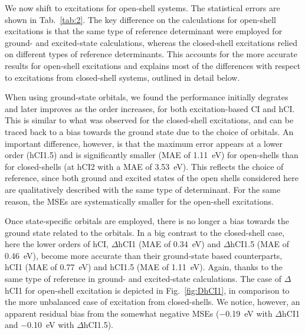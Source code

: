 \documentclass[aip,jcp,reprint,noshowkeys,superscriptaddress]{revtex4-1}
\begin{document}
We now shift to excitations for open-shell systems.
The statistical errors are shown in Tab.~\ref{tab:2}.
The key difference on the calculations for open-shell excitations is that the same type of reference determinant were employed for ground- and excited-state calculations,
whereas the closed-shell excitations relied on different types of reference determinants.
This accounts for the more accurate results for open-shell excitations and explains most of the differences with respect to excitations from closed-shell systems, outlined in detail below.


When using ground-state orbitals, we found the performance initially degrates and later improves as the order increases, for both excitation-based CI and hCI.
This is similar to what was observed for the closed-shell excitations, 
and can be traced back to a bias towards the ground state due to the choice of orbitals.
An important difference, however, is that the maximum error appears at a lower order (hCI1.5) and is significantly smaller (MAE of \SI{1.11}{\eV}) for open-shells
than for closed-shells (at hCI2 with a MAE of \SI{3.53}{\eV}).
This reflects the choice of reference, since both ground and excited states of the open shells considered here are qualitatively described with the same type of determinant.
For the same reason, the MSEs are systematically smaller for the open-shell excitations.

Once state-specific orbitals are employed, there is no longer a bias towards the ground state related to the orbitals.
In a big contrast to the closed-shell case, here the lower orders of hCI, $\Delta$hCI1 (MAE of \SI{0.34}{\eV}) and $\Delta$hCI1.5 (MAE of \SI{0.46}{\eV}), 
become more accurate than their ground-state based counterparts, hCI1 (MAE of \SI{0.77}{\eV}) and hCI1.5 (MAE of \SI{1.11}{\eV}).
Again, thanks to the same type of reference in ground- and excited-state calculations.
The case of $\Delta$hCI1 for open-shell excitation is depicted in Fig.~\ref{fig:DhCI1}, in comparison to the more unbalanced case of excitation from closed-shells.
We notice, however, an apparent residual bias from the somewhat negative MSEs (\SI{-0.19}{\eV} with $\Delta$hCI1 and \SI{-0.10}{\eV} with $\Delta$hCI1.5).
\end{document}
